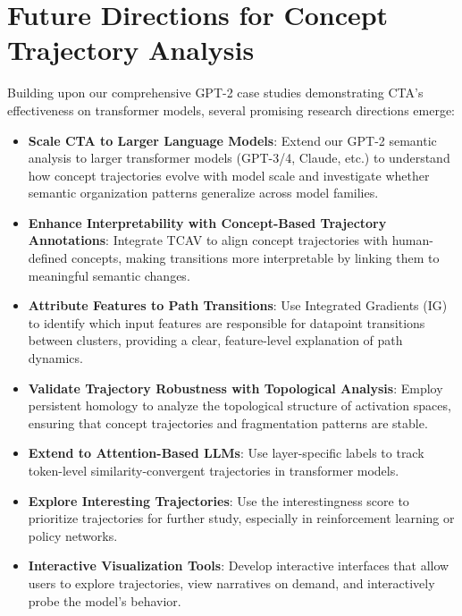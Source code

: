 \section{Future Directions for Concept Trajectory Analysis}

Building upon our comprehensive GPT-2 case studies demonstrating CTA's effectiveness on transformer models, several promising research directions emerge:

\begin{itemize}
    \item \textbf{Scale CTA to Larger Language Models}: Extend our GPT-2 semantic analysis to larger transformer models (GPT-3/4, Claude, etc.) to understand how concept trajectories evolve with model scale and investigate whether semantic organization patterns generalize across model families.
    
    \item \textbf{Enhance Interpretability with Concept-Based Trajectory Annotations}: Integrate TCAV to align concept trajectories with human-defined concepts, making transitions more interpretable by linking them to meaningful semantic changes.
    
    \item \textbf{Attribute Features to Path Transitions}: Use Integrated Gradients (IG) to identify which input features are responsible for datapoint transitions between clusters, providing a clear, feature-level explanation of path dynamics.
    
    \item \textbf{Validate Trajectory Robustness with Topological Analysis}: Employ persistent homology to analyze the topological structure of activation spaces, ensuring that concept trajectories and fragmentation patterns are stable.
    
    \item \textbf{Extend to Attention-Based LLMs}: Use layer-specific labels to track token-level similarity-convergent trajectories in transformer models.
    
    \item \textbf{Explore Interesting Trajectories}: Use the interestingness score to prioritize trajectories for further study, especially in reinforcement learning or policy networks.
    
    \item \textbf{Interactive Visualization Tools}: Develop interactive interfaces that allow users to explore trajectories, view narratives on demand, and interactively probe the model's behavior.
    

\end{itemize}
